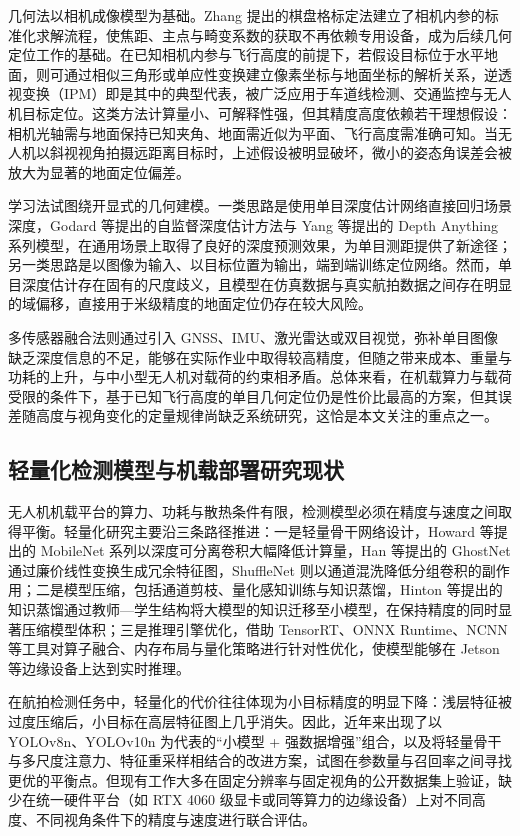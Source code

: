 几何法以相机成像模型为基础。Zhang 提出的棋盘格标定法建立了相机内参的标准化求解流程，使焦距、主点与畸变系数的获取不再依赖专用设备，成为后续几何定位工作的基础。在已知相机内参与飞行高度的前提下，若假设目标位于水平地面，则可通过相似三角形或单应性变换建立像素坐标与地面坐标的解析关系，逆透视变换（IPM）即是其中的典型代表，被广泛应用于车道线检测、交通监控与无人机目标定位。这类方法计算量小、可解释性强，但其精度高度依赖若干理想假设：相机光轴需与地面保持已知夹角、地面需近似为平面、飞行高度需准确可知。当无人机以斜视视角拍摄远距离目标时，上述假设被明显破坏，微小的姿态角误差会被放大为显著的地面定位偏差。

学习法试图绕开显式的几何建模。一类思路是使用单目深度估计网络直接回归场景深度，Godard 等提出的自监督深度估计方法与 Yang 等提出的 Depth Anything 系列模型，在通用场景上取得了良好的深度预测效果，为单目测距提供了新途径；另一类思路是以图像为输入、以目标位置为输出，端到端训练定位网络。然而，单目深度估计存在固有的尺度歧义，且模型在仿真数据与真实航拍数据之间存在明显的域偏移，直接用于米级精度的地面定位仍存在较大风险。

多传感器融合法则通过引入 GNSS、IMU、激光雷达或双目视觉，弥补单目图像缺乏深度信息的不足，能够在实际作业中取得较高精度，但随之带来成本、重量与功耗的上升，与中小型无人机对载荷的约束相矛盾。总体来看，在机载算力与载荷受限的条件下，基于已知飞行高度的单目几何定位仍是性价比最高的方案，但其误差随高度与视角变化的定量规律尚缺乏系统研究，这恰是本文关注的重点之一。

\subsection{轻量化检测模型与机载部署研究现状}

无人机机载平台的算力、功耗与散热条件有限，检测模型必须在精度与速度之间取得平衡。轻量化研究主要沿三条路径推进：一是轻量骨干网络设计，Howard 等提出的 MobileNet 系列以深度可分离卷积大幅降低计算量，Han 等提出的 GhostNet 通过廉价线性变换生成冗余特征图，ShuffleNet 则以通道混洗降低分组卷积的副作用；二是模型压缩，包括通道剪枝、量化感知训练与知识蒸馏，Hinton 等提出的知识蒸馏通过教师—学生结构将大模型的知识迁移至小模型，在保持精度的同时显著压缩模型体积；三是推理引擎优化，借助 TensorRT、ONNX Runtime、NCNN 等工具对算子融合、内存布局与量化策略进行针对性优化，使模型能够在 Jetson 等边缘设备上达到实时推理。

在航拍检测任务中，轻量化的代价往往体现为小目标精度的明显下降：浅层特征被过度压缩后，小目标在高层特征图上几乎消失。因此，近年来出现了以 YOLOv8n、YOLOv10n 为代表的“小模型 + 强数据增强”组合，以及将轻量骨干与多尺度注意力、特征重采样相结合的改进方案，试图在参数量与召回率之间寻找更优的平衡点。但现有工作大多在固定分辨率与固定视角的公开数据集上验证，缺少在统一硬件平台（如 RTX 4060 级显卡或同等算力的边缘设备）上对不同高度、不同视角条件下的精度与速度进行联合评估。

